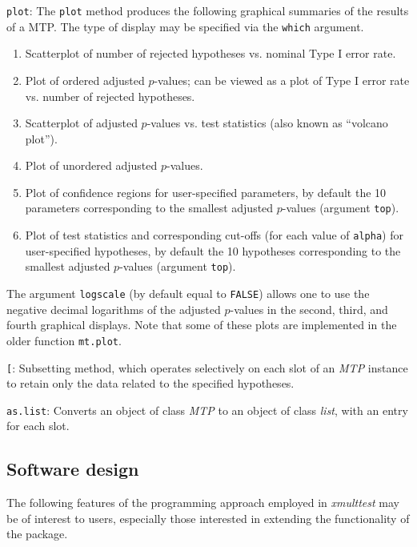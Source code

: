 \documentclass[11pt]{article}
\newcommand{\Rpackage}[1]{\textit{#1}}
\newcommand{\Robject}[1]{\texttt{#1}}
\newcommand{\Rclass}[1]{\textit{#1}}
\begin{document}
\begin{description}
\item{\Robject{plot}:}   
The \Robject{plot} method produces the following graphical summaries of the results of a MTP. The type of display may be specified via the \Robject{which} argument.
\begin{enumerate}
\item
Scatterplot of number of rejected hypotheses vs. nominal Type I error rate.
\item
Plot of ordered adjusted $p$-values; can be viewed as a plot of Type I error rate vs. number of rejected hypotheses.
\item
Scatterplot of adjusted $p$-values vs. test statistics (also known as ``volcano plot'').
\item
Plot of unordered adjusted $p$-values.
\item
Plot of confidence regions for user-specified parameters, by default the 10 parameters corresponding to the smallest adjusted $p$-values  (argument \Robject{top}).
\item
Plot of test statistics and corresponding cut-offs (for each value of \Robject{alpha}) for user-specified hypotheses, by default the 10 hypotheses corresponding to the smallest adjusted $p$-values (argument \Robject{top}).
\end{enumerate}
The argument \Robject{logscale} (by default equal to \Robject{FALSE}) allows one to use the negative decimal logarithms of the adjusted $p$-values in the second, third, and fourth graphical displays.
Note that some of these plots are implemented in the older function \Robject{mt.plot}.

\item{\Robject{[}:} 
Subsetting method, which operates selectively on each slot of an \Rclass{MTP} instance to retain only the data related to the specified hypotheses.

\item{\Robject{as.list}:} 
Converts an object of class \Rclass{MTP} to an object of class \Rclass{list}, with an entry for each slot. 

\end{description}


\subsection{Software design}
\label{anal:mult:s:design}

The following features of the programming approach employed in \Rpackage{xmulttest} may be of interest to users, especially those interested in extending the functionality of the package. \\
\end{document}
